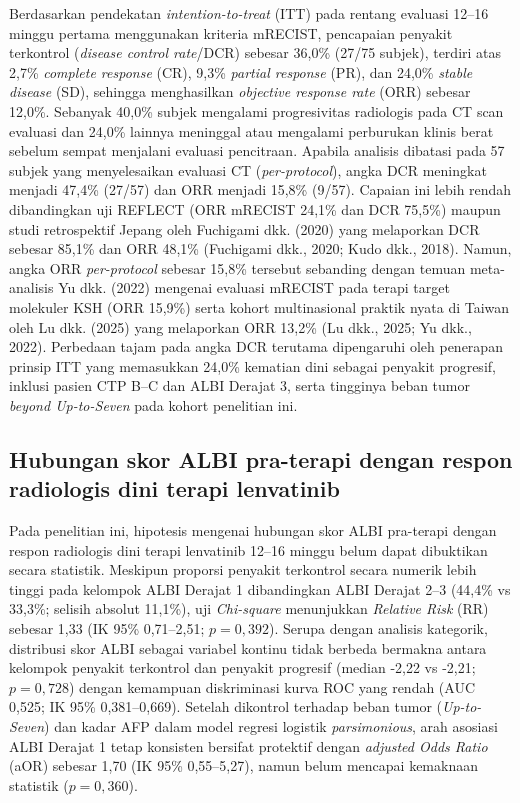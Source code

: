 \documentclass[
  indonesian,
]{report}
\begin{document}
Berdasarkan pendekatan \emph{intention-to-treat} (ITT) pada rentang
evaluasi 12--16 minggu pertama menggunakan kriteria mRECIST, pencapaian
penyakit terkontrol (\emph{disease control rate}/DCR) sebesar 36,0\%
(27/75 subjek), terdiri atas 2,7\% \emph{complete response} (CR), 9,3\%
\emph{partial response} (PR), dan 24,0\% \emph{stable disease} (SD),
sehingga menghasilkan \emph{objective response rate} (ORR) sebesar
12,0\%. Sebanyak 40,0\% subjek mengalami progresivitas radiologis pada
CT scan evaluasi dan 24,0\% lainnya meninggal atau mengalami perburukan
klinis berat sebelum sempat menjalani evaluasi pencitraan. Apabila
analisis dibatasi pada 57 subjek yang menyelesaikan evaluasi CT
(\emph{per-protocol}), angka DCR meningkat menjadi 47,4\% (27/57) dan
ORR menjadi 15,8\% (9/57). Capaian ini lebih rendah dibandingkan uji
REFLECT (ORR mRECIST 24,1\% dan DCR 75,5\%) maupun studi retrospektif
Jepang oleh Fuchigami dkk. (2020) yang melaporkan DCR sebesar 85,1\% dan
ORR 48,1\% (Fuchigami dkk., 2020; Kudo dkk., 2018). Namun, angka ORR
\emph{per-protocol} sebesar 15,8\% tersebut sebanding dengan temuan
meta-analisis Yu dkk. (2022) mengenai evaluasi mRECIST pada terapi
target molekuler KSH (ORR 15,9\%) serta kohort multinasional praktik
nyata di Taiwan oleh Lu dkk. (2025) yang melaporkan ORR 13,2\% (Lu dkk.,
2025; Yu dkk., 2022). Perbedaan tajam pada angka DCR terutama
dipengaruhi oleh penerapan prinsip ITT yang memasukkan 24,0\% kematian
dini sebagai penyakit progresif, inklusi pasien CTP B--C dan ALBI
Derajat 3, serta tingginya beban tumor \emph{beyond Up-to-Seven} pada
kohort penelitian ini.

\subsection{Hubungan skor ALBI pra-terapi dengan respon radiologis dini
terapi
lenvatinib}\label{hubungan-skor-albi-pra-terapi-dengan-respon-radiologis-dini-terapi-lenvatinib}

Pada penelitian ini, hipotesis mengenai hubungan skor ALBI pra-terapi
dengan respon radiologis dini terapi lenvatinib 12--16 minggu belum
dapat dibuktikan secara statistik. Meskipun proporsi penyakit terkontrol
secara numerik lebih tinggi pada kelompok ALBI Derajat 1 dibandingkan
ALBI Derajat 2--3 (44,4\% vs 33,3\%; selisih absolut 11,1\%), uji
\emph{Chi-square} menunjukkan \emph{Relative Risk} (RR) sebesar 1,33 (IK
95\% 0,71--2,51; \(p = 0,392\)). Serupa dengan analisis kategorik,
distribusi skor ALBI sebagai variabel kontinu tidak berbeda bermakna
antara kelompok penyakit terkontrol dan penyakit progresif (median -2,22
vs -2,21; \(p = 0,728\)) dengan kemampuan diskriminasi kurva ROC yang
rendah (AUC 0,525; IK 95\% 0,381--0,669). Setelah dikontrol terhadap
beban tumor (\emph{Up-to-Seven}) dan kadar AFP dalam model regresi
logistik \emph{parsimonious}, arah asosiasi ALBI Derajat 1 tetap
konsisten bersifat protektif dengan \emph{adjusted Odds Ratio} (aOR)
sebesar 1,70 (IK 95\% 0,55--5,27), namun belum mencapai kemaknaan
statistik (\(p = 0,360\)).
\end{document}
